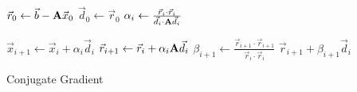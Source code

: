 \begin{algorithm}[tb]
	\begin{algorithmic}
		\STATE \(\vec{r}_0 \gets \vec{b} - \mathbf{A}\vec{x}_0\)
		\STATE \(\vec{d}_0 \gets \vec{r}_0\)
			\STATE \(\alpha_i \gets \frac{\vec{r}_i\cdot\vec{r}_i}{\vec{d}_i\cdot \mathbf{A}\vec{d}_i}\)
			
			\STATE \(\vec{x}_{i+1} \gets \vec{x}_i + \alpha_i\vec{d}_i\)
			\STATE \(\vec{r}_{i+1} \gets \vec{r}_i + \alpha_i\mathbf{A}\vec{d}_i\)
			\STATE \(\beta_{i+1} \gets \frac{\vec{r}_{i+1}\cdot\vec{r}_{i+1}}{\vec{r}_i\cdot\vec{r}_i}\)
			\STATE \(\vec{r}_{i+1} + \beta_{i+1}\vec{d}_i\)
		\ENDFOR
	\end{algorithmic}
	
	\caption{Conjugate Gradient~\cite{Saad:2003:IterativeMethods}}
	\label{alg:bg-cg-alg-cg}
\end{algorithm}



